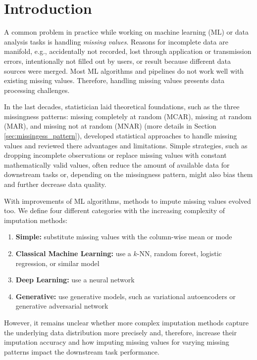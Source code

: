 \section{Introduction}
\label{sec:introduction}

A common problem in practice while working on machine learning (ML) or data analysis tasks is handling \emph{missing values}. Reasons for incomplete data are manifold, e.g., accidentally not recorded, lost through application or transmission errors, intentionally not filled out by users, or result because different data sources were merged. Most ML algorithms and pipelines do not work well with existing missing values. Therefore, handling missing values presents data processing challenges.

In the last decades, statistician laid theoretical foundations, such as the three missingness patterns: missing completely at random (MCAR), missing at random (MAR), and missing not at random (MNAR) (more details in Section \ref{sec:missingess_pattern}), developed statistical approaches to handle missing values and reviewed there advantages and limitations. Simple strategies, such as dropping incomplete observations or replace missing values with constant mathematically valid values, often reduce the amount of available data for downstream tasks or, depending on the missingness pattern, might also bias them and further decrease data quality.

With improvements of ML algorithms, methods to impute missing values evolved too. We define four different categories with the increasing complexity of imputation methods:
%
\begin{enumerate}
	\item \textbf{Simple:} substitute missing values with the column-wise mean or mode
	\item \textbf{Classical Machine Learning:} use a $k$-NN, random forest, logistic regression, or similar model
	\item \textbf{Deep Learning:} use a neural network
	\item \textbf{Generative:} use generative models, such as variational autoencoders or generative adversarial network
\end{enumerate}
%
However, it remains unclear whether more complex imputation methods capture the underlying data distribution more precisely and, therefore, increase their imputation accuracy and how imputing missing values for varying missing patterns impact the downstream task performance.

